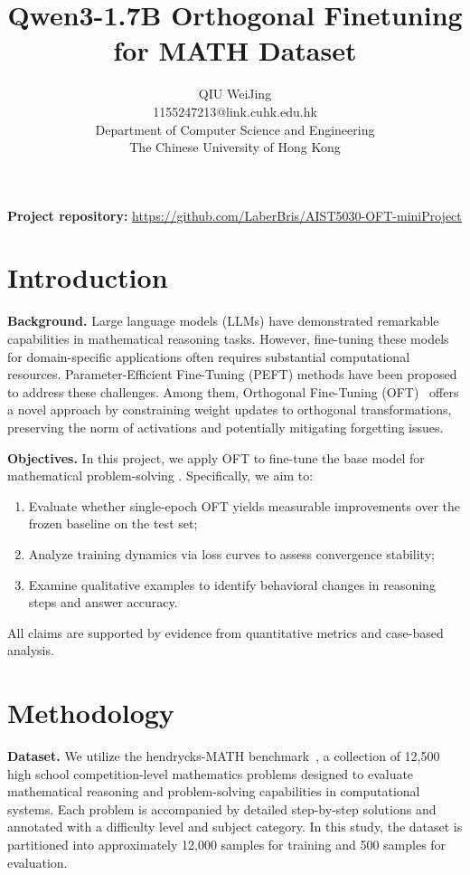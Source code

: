 \documentclass{article}
\title{Qwen3-1.7B Orthogonal Finetuning for MATH Dataset}
\author{%
  QIU WeiJing\\
  1155247213@link.cuhk.edu.hk\\
  Department of Computer Science and Engineering\\
  The Chinese University of Hong Kong\\
}
\begin{document}
\maketitle

\noindent\textbf{Project repository:} \url{https://github.com/LaberBris/AIST5030-OFT-miniProject}

\section{Introduction}
\label{sec:introduction}

\textbf{Background.} Large language models (LLMs) have demonstrated remarkable capabilities in mathematical reasoning tasks. However, fine-tuning these models for domain-specific applications often requires substantial computational resources. Parameter-Efficient Fine-Tuning (PEFT) methods have been proposed to address these challenges. Among them, Orthogonal Fine-Tuning (OFT)~\cite{qiu2023controlling} offers a novel approach by constraining weight updates to orthogonal transformations, preserving the norm of activations and potentially mitigating forgetting issues.

\textbf{Objectives.} In this project, we apply OFT to fine-tune the base model for mathematical problem-solving . Specifically, we aim to: \begin{enumerate}
    \item Evaluate whether single-epoch OFT yields measurable improvements 
          over the frozen baseline on the test set;
    \item Analyze training dynamics via loss curves to assess convergence 
          stability;
    \item Examine qualitative examples to identify behavioral changes in 
          reasoning steps and answer accuracy.
\end{enumerate}
All claims are supported by evidence from quantitative metrics and case-based 
analysis.

\section{Methodology}

\textbf{Dataset.} We utilize the hendrycks-MATH benchmark~\cite{hendrycks2021measuringmathematicalproblemsolving}, a collection of 12,500 high school competition-level mathematics problems designed to evaluate mathematical reasoning and problem-solving capabilities in computational systems. Each problem is accompanied by detailed step-by-step solutions and annotated with a difficulty level and subject category. In this study, the dataset is partitioned into approximately 12,000 samples for training and 500 samples for evaluation.
\end{document}
